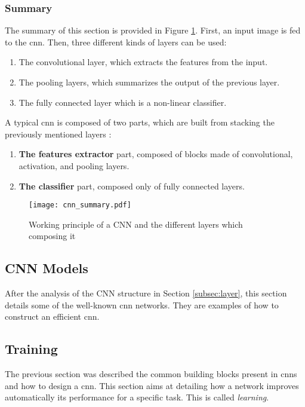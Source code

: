 \subsubsection{Summary}
%
The summary of this section is provided in Figure \ref{fig:layer:summary}. First, an input image is fed to the \acrshort{cnn}. Then, three different kinds of layers can be used:
%
\begin{enumerate}
    \item The convolutional layer, which extracts the features from the input.
    \item The pooling layers, which summarizes the output of the previous layer.
    \item The fully connected layer which is a non-linear classifier.
\end{enumerate}
%
A typical \acrshort{cnn} is composed of two parts, which are built from stacking the previously mentioned layers \cite{matteucci_artificial_2019}:
\begin{enumerate}
    \item \textbf{The features extractor} part, composed of blocks made of convolutional, activation, and pooling layers.
    \item \textbf{The classifier} part, composed only of fully connected layers.
\end{enumerate}
%
\begin{figure}[H]
    \centering
    \texttt{[image: cnn\_summary.pdf]}
    \caption{Working principle of a CNN and the different layers which composing it}
    \label{fig:layer:summary}
\end{figure}
%
\subsection{CNN Models} \label{subsec:models}
After the analysis of the CNN structure in Section \ref{subsec:layer}, this section details some of the well-known \acrshort{cnn} networks. They are examples of how to construct an efficient \acrshort{cnn}.

%

%
%
\subsection{Training} \label{subsec:train}
The previous section was described the common building blocks present in \acrshort{cnn}s and how to design a \acrshort{cnn}. This section aims at detailing how a network improves automatically its performance for a specific task. This is called \textit{learning}.

